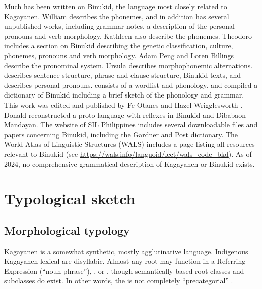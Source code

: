 Much has been written on Binukid, the language most closely related to Kagayanen. William \citet{atherton1953} describes the phonemes, and in addition has several unpublished works, including grammar notes, a description of the personal pronouns  and verb morphology. Kathleen \citet{meiklejohn1953} also describe the phonemes. Theodoro \citet{llamzon1974} includes a section on Binukid describing the genetic classification, culture, phonemes, pronouns and verb morphology. Adam Peng and Loren Billings \citep{peng2006} describe the pronominal system.  Ursula \citet{post1965c} describes morphophonemic alternations. \citet{postsentence1968} describes sentence structure, \citet{postphrase1968} phrase and clause structure, \citet{post1978} Binukid texts, and \citet{posttagmemes1965} describes personal pronouns. \citet{reid1971} consists of a wordlist and phonology.  and  compiled a dictionary of Binukid including a brief sketch of the phonology and grammar. This work was edited and published by Fe Otanes and Hazel Wrigglesworth \citep{otanes1992}. Donald \citet{stark1961} reconstructed a proto-language with reflexes in Binukid and Dibabaon-Mandayan. The website of SIL Philippines includes several downloadable files and papers concerning Binukid, including the Gardner and Post dictionary. The World Atlas of Linguistic Structures (WALS) includes a page listing all resources relevant to Binukid (see \url{https://wals.info/languoid/lect/wals_code_bkd}). As of 2024, no comprehensive grammatical description of Kagayanen or Binukid exists.

\section{Typological sketch}\label{sec:1.6} \label{sec:typology}
\subsection{Morphological typology}\label{sec:1.6.1} 
Kagayanen is a somewhat synthetic, mostly agglutinative language. Indigenous Kagayanen lexical  are disyllabic. Almost any root may function in a Referring Expression  (“noun phrase”), , or , though semantically-based root classes and subclasses do exist. In other words, the  is not completely “precategorial” \citep{foley2008, himmelmann2008}.

